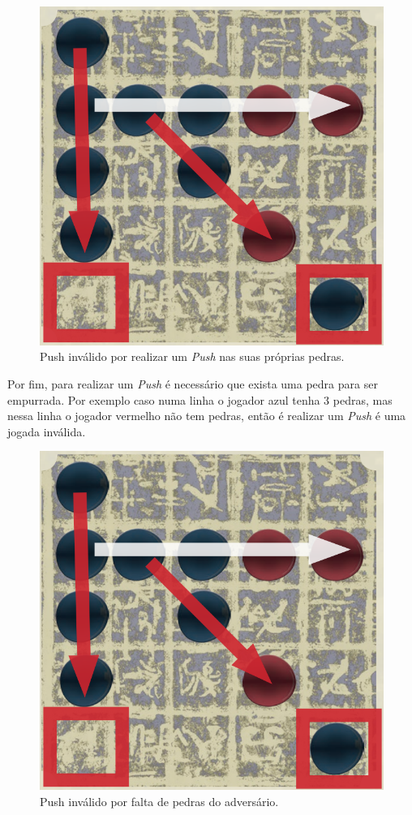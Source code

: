 \documentclass[a4paper]{article}
\begin{document}
\begin{figure}[!htb]
\centering
\includegraphics[scale=0.3]{push2.png} 
\caption{Push inválido por realizar um \textit{Push} nas suas próprias pedras.}
\end{figure}

Por fim, para realizar um \textit{Push} é necessário que exista uma pedra para ser empurrada. Por exemplo caso numa linha o jogador azul tenha 3 pedras, mas nessa linha o jogador vermelho não tem pedras, então é realizar um  \textit{Push} é uma jogada inválida.

\begin{figure}[!htb]
\centering
\includegraphics[scale=0.3]{push2.png} 
\caption{Push inválido por falta de pedras do adversário.}
\end{figure}
\end{document}

